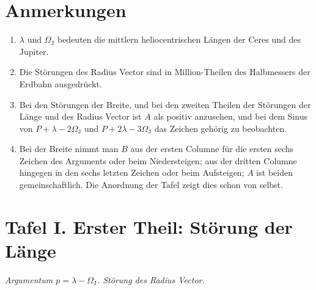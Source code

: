 \documentclass[11pt,a4paper]{book}
\begin{document}
\section*{Anmerkungen}

\begin{enumerate}[label=\arabic*.]
\item $\lambda$ und $\Omega_{\mathrm{J}}$ bedeuten die mittlern heliocentrischen Längen der Ceres und des Jupiter.
\item Die Störungen des Radius Vector sind in Million-Theilen des Halbmessers der Erdbahn ausgedrückt.
\item Bei den Störungen der Breite, und bei den zweiten Theilen der Störungen der Länge und des Radius Vector ist $A$ als positiv anzusehen, und bei dem Sinus von $P + \lambda - 2\Omega_{\mathrm{J}}$ und $P + 2\lambda - 3\Omega_{\mathrm{J}}$ das Zeichen gehörig zu beobachten.
\item Bei der Breite nimmt man $B$ aus der ersten Columne für die ersten sechs Zeichen des Arguments oder beim Niedersteigen; aus der dritten Columne hingegen in den sechs letzten Zeichen oder beim Aufsteigen; $A$ ist beiden gemeinschaftlich. Die Anordnung der Tafel zeigt dies schon von selbst.
\end{enumerate}

\section*{Tafel I. Erster Theil: Störung der Länge}

\textit{Argumentum $p = \lambda - \Omega_{\mathrm{J}}$. Störung des Radius Vector.}
\end{document}
